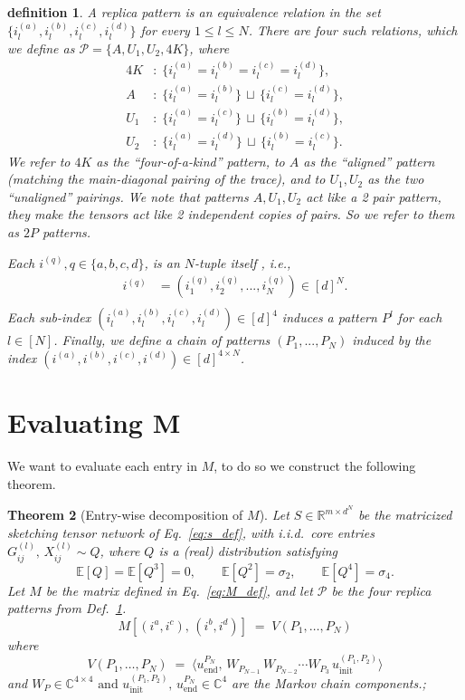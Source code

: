 \documentclass[12pt,a4paper]{article}
\newtheorem{theorem}{Theorem}[section]
\newtheorem{definition}[theorem]{definition}
\newcommand{\C}{\mathbb{C}}
\begin{document}
\begin{definition}
\label{def:patterns}
A replica pattern is an equivalence relation in the set $\{i^{(a)}_l,i^{(b)}_l,i^{(c)}_l,i^{(d)}_l\}$ for every $1\le l\le N$. There are four such relations, which we define as    $\mathcal{P} = \{A, U_1, U_2, 4K\}$, where
\begin{align}
4K &:\; \{i^{(a)}_l=i^{(b)}_l=i^{(c)}_l=i^{(d)}_l\}, \label{eq:patterns} \\
A  &:\; \{i^{(a)}_l=i^{(b)}_l\} \,\sqcup\, \{i^{(c)}_l=i^{(d)}_l\}, \nonumber \\
U_1 &:\; \{i^{(a)}_l=i^{(c)}_l\} \,\sqcup\, \{i^{(b)}_l=i^{(d)}_l\}, \nonumber \\
U_2 &:\; \{i^{(a)}_l=i^{(d)}_l\} \,\sqcup\, \{i^{(b)}_l=i^{(c)}_l\}. \nonumber
\end{align}
We refer to $4K$ as the ``four-of-a-kind'' pattern, to $A$ as the ``aligned'' pattern (matching the main-diagonal pairing of the trace), and to $U_1, U_2$ as the two ``unaligned'' pairings. 
We note that patterns $A,U_1,U_2$  act like a 2 pair pattern, they make the tensors act like 2 independent copies of pairs. So we refer to them as $2P$  patterns.

\label{def:Chain}
Each  $i^{(q)},q\in\{a,b,c,d\} $, is an $N$-tuple itself , i.e.,
\begin{align}
    i^{(q)}&=(i^{(q)}_1,i^{(q)}_2,...,i^{(q)}_N)\in [d]^N.\\
\end{align}
Each sub-index $(i^{(a)}_l,i^{(b)}_l,i^{(c)}_l,i^{(d)}_l)\in[d]^4$ induces a pattern $P^l$  for each $ l\in[N]$.
Finally, we define a chain of patterns  $(P_1,...,P_N)$ induced by the index $(i^{(a)},i^{(b)},i^{(c)},i^{(d)})\in[d]^{4\times N}$.
\end{definition}
\pagebreak
\section{Evaluating M}
We want to evaluate each entry in $M$, to do so we construct the following theorem.
\begin{theorem}[Entry-wise decomposition of $M$]
\label{thm:per-entry-M}
Let $S \in \mathbb{R}^{m \times d^N}$ be the matricized sketching tensor network of Eq.~\eqref{eq:s_def}, with i.i.d.\ core entries $G^{(l)}_{ij},\, X^{(l)}_{ij} \sim Q$, where $Q$ is a (real) distribution satisfying
\[
\mathbb{E}[Q] = \mathbb{E}[Q^3] = 0, \qquad \mathbb{E}[Q^2] = \sigma_2, \qquad \mathbb{E}[Q^4] = \sigma_4.
\]
Let $M$ be the matrix defined in Eq.~\eqref{eq:M_def}, and let  $\mathcal{P}$ be the four replica patterns from Def.~\ref{def:patterns}. 
\begin{equation}
\label{eq:per-entry-M}
M\!\left[(i^a,i^c),\,(i^b,i^d)\right]
\;=\;
V(P_1,\dots,P_N)
\end{equation}
where 
\begin{equation}
\label{eq:chain-value}
V(P_1,\dots,P_N)
\;=\;
\bigl\langle u^{P_N}_{\mathrm{end}},
\, W_{P_{N-1}}\, W_{P_{N-2}} \cdots W_{P_{3}}\,
u^{(P_1,P_2)}_{\mathrm{init}}\rangle
\end{equation}
and  $W_P\in \C^{4\times 4}\text{ and } u^{(P_1,P_2)}_{\mathrm{init}},\, u^{P_N}_{\mathrm{end}}\in\C^{4}$   are the Markov chain components.;
\end{theorem}
\end{document}
